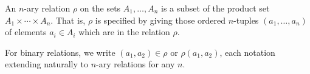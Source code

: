 An $n$-ary relation $\rho$ on the sets $A_1, \ldots, A_n$ is a subset of the product set $A_1 \times \cdots \times A_n$. That is, $\rho$ is specified by giving those ordered $n$-tuples $(a_1, \ldots, a_n)$ of elements $a_i \in A_i$ which are in the relation $\rho$.

For binary relations, we write $(a_1, a_2) \in \rho$ or $\rho(a_1, a_2)$, each notation extending naturally to $n$-ary relations for any $n$.
